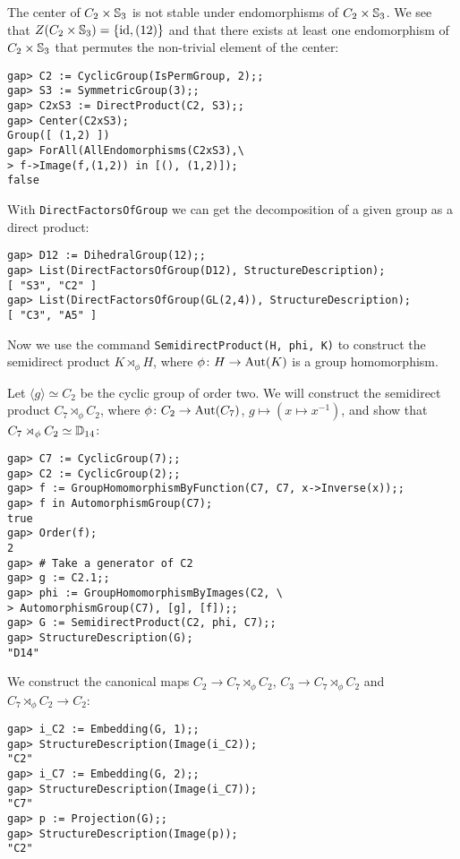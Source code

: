 \begin{example}
The center of $C_2\times\mathbb{S}_3$ is not stable under endomorphisms of 
$C_2\times\mathbb{S}_3$. We see that 
$Z(C_2\times\mathbb{S}_3)=\{\operatorname{id},(12)\}$ and 
that there exists at least one endomorphism of $C_2\times\mathbb{S}_3$ that permutes 
the non-trivial element of the center:
\begin{lstlisting}
gap> C2 := CyclicGroup(IsPermGroup, 2);;
gap> S3 := SymmetricGroup(3);;
gap> C2xS3 := DirectProduct(C2, S3);;
gap> Center(C2xS3);
Group([ (1,2) ])
gap> ForAll(AllEndomorphisms(C2xS3),\
> f->Image(f,(1,2)) in [(), (1,2)]);
false
\end{lstlisting}
\end{example}

With \lstinline{DirectFactorsOfGroup} we can 
get the decomposition of a given group as a direct product: 
\begin{lstlisting}
gap> D12 := DihedralGroup(12);;
gap> List(DirectFactorsOfGroup(D12), StructureDescription);
[ "S3", "C2" ]
gap> List(DirectFactorsOfGroup(GL(2,4)), StructureDescription);
[ "C3", "A5" ]
\end{lstlisting}

Now we use
the command 
\lstinline{SemidirectProduct(H, phi, K)} to  
construct the semidirect product $K\rtimes_{\phi} H$, 
where $\phi\colon H\to\operatorname{Aut}(K)$ is a group homomorphism. 

\begin{example}
Let $\langle g\rangle\simeq C_2$ be the cyclic group of order two. 
We will construct the semidirect product $C_7\rtimes_{\phi} C_2$, 
where $\phi\colon C_2\to\operatorname{Aut}(C_7)$, $g\mapsto (x\mapsto x^{-1})$, 
and show that $C_7\rtimes_{\phi}C_2\simeq\mathbb{D}_{14}$:
\begin{lstlisting}
gap> C7 := CyclicGroup(7);;
gap> C2 := CyclicGroup(2);;
gap> f := GroupHomomorphismByFunction(C7, C7, x->Inverse(x));;
gap> f in AutomorphismGroup(C7);
true
gap> Order(f);
2
gap> # Take a generator of C2
gap> g := C2.1;;
gap> phi := GroupHomomorphismByImages(C2, \ 
> AutomorphismGroup(C7), [g], [f]);;
gap> G := SemidirectProduct(C2, phi, C7);;
gap> StructureDescription(G);
"D14"
\end{lstlisting}
We construct the canonical maps $C_2\to C_7\rtimes_{\phi}C_2$, 
$C_3\to C_7\rtimes_{\phi}C_2$ and  $C_7\rtimes_{\phi}C_2\to C_2$:
\begin{lstlisting}
gap> i_C2 := Embedding(G, 1);;
gap> StructureDescription(Image(i_C2));
"C2"
gap> i_C7 := Embedding(G, 2);;
gap> StructureDescription(Image(i_C7));
"C7"
gap> p := Projection(G);;
gap> StructureDescription(Image(p));
"C2"
\end{lstlisting}
\end{example}

